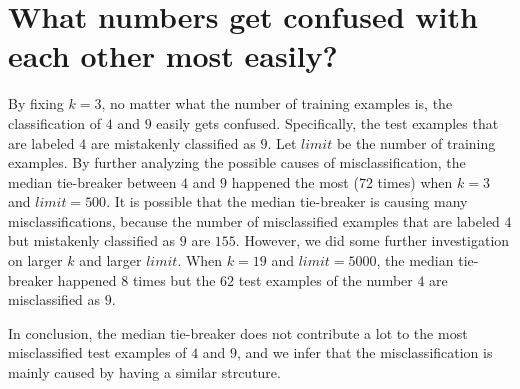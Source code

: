 \documentclass[11pt]{article}
\begin{document}

\section{What numbers get confused with each other most easily?}

By fixing $k = 3$, no matter what the number of training examples is, the classification of $4$ and $9$ easily gets confused. 
Specifically, the test examples that are labeled $4$ are mistakenly classified as $9$.
Let $limit$ be the number of training examples. 
By further analyzing the possible causes of misclassification, the median tie-breaker between $4$ and $9$ happened the most ($72$ times) when $k = 3$ and $limit = 500$. 
It is possible that the median tie-breaker is causing many misclassifications, because the number of misclassified examples that are labeled $4$ but mistakenly classified as $9$ are $155$. 
However, we did some further investigation on larger $k$ and larger $limit$. 
When $k = 19$ and $limit = 5000$, the median tie-breaker happened $8$ times but the $62$ test examples of the number $4$ are misclassified as $9$.

In conclusion, the median tie-breaker does not contribute a lot to the most misclassified test examples of $4$ and $9$, and we infer that the misclassification is mainly caused by having a similar strcuture.
\end{document}
